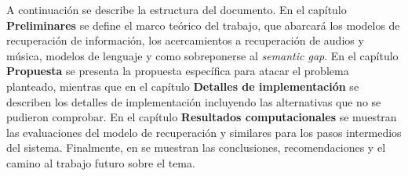 A continuación se describe la estructura del documento. En el capítulo \textbf{Preliminares} se define el marco teórico del trabajo, que abarcará los modelos de recuperación de información, los acercamientos a recuperación de audios y música, modelos de lenguaje y como sobreponerse al \textit{semantic gap}. En el capítulo \textbf{Propuesta} se presenta la propuesta específica para atacar el problema planteado, mientras que en el capítulo \textbf{Detalles de implementación} se describen los detalles de implementación incluyendo las alternativas que no se pudieron comprobar. En el capítulo \textbf{Resultados computacionales} se muestran las evaluaciones del modelo de recuperación y similares para los pasos intermedios del sistema. Finalmente, en se muestran las conclusiones, recomendaciones y el camino al trabajo futuro sobre el tema.



